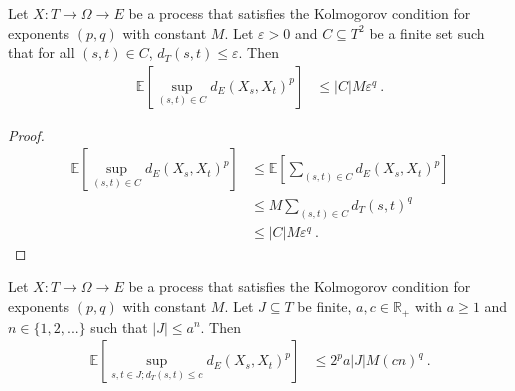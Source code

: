 \begin{lemma}\label{lem:integral_sup_rpow_dist_le_card_mul_rpow}
  \leanok
Let $X : T \to \Omega \to E$ be a process that satisfies the Kolmogorov condition for exponents $(p,q)$ with constant $M$.
Let $\varepsilon > 0$ and $C \subseteq T^2$ be a finite set such that for all $(s, t) \in C$, $d_T(s, t) \le \varepsilon$.
Then
\begin{align*}
  \mathbb{E}\left[\sup_{(s,t) \in C} d_E(X_s, X_t)^p \right]
  &\le \vert C \vert M \varepsilon^q
  \: .
\end{align*}
\end{lemma}

\begin{proof}\leanok
\begin{align*}
  \mathbb{E}\left[\sup_{(s,t) \in C} d_E(X_s, X_t)^p \right]
  &\le \mathbb{E}\left[\sum_{(s,t) \in C} d_E(X_s, X_t)^p \right]
  \\
  &\le M \sum_{(s,t) \in C} d_T(s, t)^q
  \\
  &\le \vert C \vert M \varepsilon^q
  \: .
\end{align*}
\end{proof}


\begin{lemma}\label{lem:integral_sup_rpow_dist_of_dist_le}
  \leanok
Let $X : T \to \Omega \to E$ be a process that satisfies the Kolmogorov condition for exponents $(p,q)$ with constant $M$.
Let $J \subseteq T$ be finite, $a, c \in \mathbb R_+$ with $a \ge 1$ and $n \in \{1, 2, ...\}$ such that $|J| \le a^n$.
Then
\begin{align*}
  \mathbb{E} \left[ \sup_{s, t \in J; d_T(s, t) \le c} d_E(X_s, X_t)^p \right]
  &\le 2^p a |J| M (cn)^q
  \: .
\end{align*}
\end{lemma}

